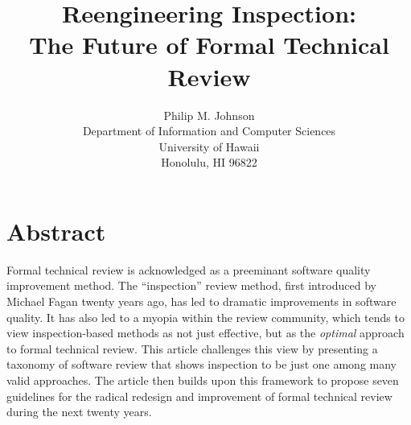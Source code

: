 

                


\title{{\bf Reengineering Inspection: \\
       The Future of Formal Technical Review}}

\author{Philip M. Johnson\\
        Department of Information and Computer Sciences\\
        University of Hawaii\\
        Honolulu, HI 96822}

\date{}

\maketitle

\section*{Abstract}

  Formal technical review is acknowledged as a preeminant software
  quality improvement method. The ``inspection'' review method, first
  introduced by Michael Fagan twenty years ago, has led to dramatic
  improvements in software quality. It has also led to a myopia within
  the review community, which tends to view inspection-based methods as
  not just effective, but as the {\em optimal} approach to formal
  technical review.  This article challenges this view by presenting a
  taxonomy of software review that shows inspection to be just one among
  many valid approaches. The article then builds upon this framework to propose
  seven guidelines for the radical redesign and improvement of formal
  technical review during the next twenty years.

